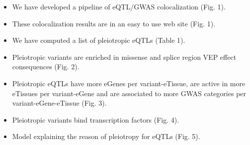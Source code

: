 \documentclass[portrait,a0b,final,a4resizeable]{a0poster}
\newenvironment{poster}{
	  \begin{center}
	  \begin{minipage}[c]{0.98\textwidth}
	}{
	  \end{minipage} 
	  \end{center}
	}
\newcommand{\pbox}[4]{
	\psshadowbox[#3]{
	\begin{minipage}[t][#2][t]{#1}
	#4
	\end{minipage}
	}}
\newcommand{\fontheader}[1]{\Huge \textsf{#1}}
\begin{document}
\begin{poster}
\begin{multicols}{2}
	\vspace{0.5cm} %
	
	
	\begin{center}\pbox{0.8\columnwidth}{}{linewidth=2mm,framearc=0.1,linecolor=lightblue,fillstyle=gradient,gradangle=0,gradbegin=white,gradend=whiteblue,gradmidpoint=1.0,framesep=0.5em}{\begin{center}\fontheader{Conclusions}\end{center}}\end{center}
	
	\begin{itemize}	
	\item We have developed a pipeline of eQTL/GWAS colocalization (Fig. 1).
	\item These colocalization results are in an easy to use web site (Fig. 1).
	\item We have computed a list of pleiotropic eQTLs (Table 1).
	\item Pleiotropic variants are enriched in missense and splice region VEP effect consequences (Fig. 2).
	\item Pleiotropic eQTLs have more eGenes per variant-eTissue, are active in more eTissues per variant-eGene and are associated to more GWAS categories per variant-eGene-eTissue (Fig. 3).
	\item Pleiotropic variants bind transcription factors (Fig. 4).
	\item Model explaining the reason of pleiotropy for eQTLs (Fig. 5).
	\end{itemize}
	
	\normalsize
	
	
	
	\end{multicols}
	
	
	\end{poster}
	
	
\end{document}
